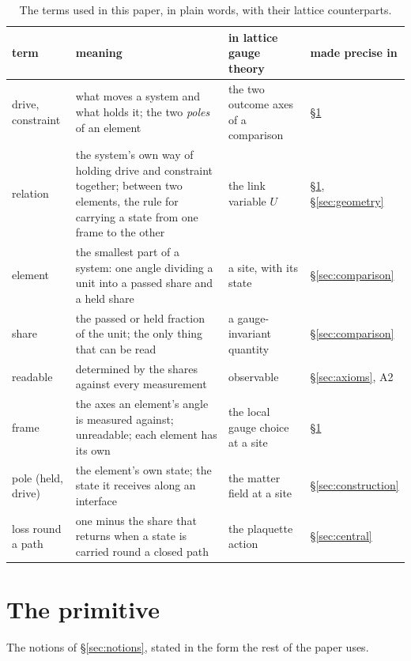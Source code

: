 \documentclass[11pt,a4paper]{article}
\theoremstyle{plain}
\theoremstyle{definition}
\theoremstyle{remark}
\begin{document}
\begin{table}[!htbp]
\centering\small
\caption{The terms used in this paper, in plain words, with their lattice counterparts.}
\label{tab:terms}
\begin{tabular}{@{}>{\raggedright\arraybackslash}p{2.3cm}>{\raggedright\arraybackslash}p{6cm}>{\raggedright\arraybackslash}p{3.9cm}>{\raggedright\arraybackslash}p{1.9cm}@{}}
\toprule
term & meaning & in lattice gauge theory & made precise in\\
\midrule
drive, constraint & what moves a system and what holds it; the two \emph{poles} of an element & the two outcome axes of a comparison & \S\ref{sec:primitive}\\
relation & the system's own way of holding drive and constraint together; between two elements, the rule for carrying a state from one frame to the other & the link variable $U$ & \S\ref{sec:primitive}, \S\ref{sec:geometry}\\
element & the smallest part of a system: one angle dividing a unit into a passed share and a held share & a site, with its state & \S\ref{sec:comparison}\\
share & the passed or held fraction of the unit; the only thing that can be read & a gauge-invariant quantity & \S\ref{sec:comparison}\\
readable & determined by the shares against every measurement & observable & \S\ref{sec:axioms}, A2\\
frame & the axes an element's angle is measured against; unreadable; each element has its own & the local gauge choice at a site & \S\ref{sec:primitive}\\
pole (held, drive) & the element's own state; the state it receives along an interface & the matter field at a site & \S\ref{sec:construction}\\
loss round a path & one minus the share that returns when a state is carried round a closed path & the plaquette action & \S\ref{sec:central}\\
\bottomrule
\end{tabular}
\end{table}

\clearpage
\section{The primitive}\label{sec:primitive}

The notions of \S\ref{sec:notions}, stated in the form the rest of the paper uses.
\end{document}
